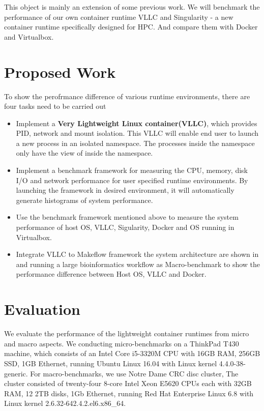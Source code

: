 \documentclass{article}
\begin{document}
\medskip

This object is mainly an extension of some previous work. We will benchmark the performance of our
own container runtime VLLC and Singularity - a new container runtime specifically designed for HPC.
And compare them with Docker and Virtualbox.

\section{Proposed Work}

To show the perofrmance difference of various runtime environments, there are four tasks need to be carried out 

\begin{itemize}

    \item Implement a \textbf{Very Lightweight Linux container(VLLC)}, which provides PID, network and mount 
        isolation. This VLLC will enable end user to launch a new process in an isolated namespace. The processes 
        inside the namespace only have the view of inside the namespace.  

    \item Implement a benchmark framework for measuring the CPU, memory, disk I/O and network performance for user 
        specified runtime environments. By launching the framework in desired environment, it will automatically 
        generate histograms of system performance. 

    \item Use the benchmark framework mentioned above to measure the system performance of host OS, VLLC, 
        Sigularity, Docker and OS running in Virtualbox.

    \item Integrate VLLC to Makeflow framework the system architecture are shown in and running a large bioinformatics 
        workflow as Macro-benchmark to show the performance difference between Host OS, VLLC and Docker.


\end{itemize}


\section{Evaluation}

We evaluate the performance of the lightweight container runtimes from micro and macro aspects. We conducting 
micro-benchmarks on a ThinkPad T430 machine, which consists of an Intel Core i5-3320M CPU with 16GB RAM, 256GB
SSD, 1GB Ethernet, running Ubuntu Linux 16.04 with Linux kernel 4.4.0-38-generic. For macro-benchmarks, we use
Notre Dame CRC disc cluster, The cluster consisted of twenty-four 8-core Intel Xeon E5620 CPUs each with 32GB
RAM, 12 2TB disks, 1Gb Ethernet, running Red Hat Enterprise Linux 6.8 with Linux kernel 2.6.32-642.4.2.el6.x86\_64.
\end{document}
